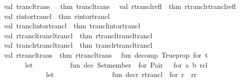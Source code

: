 \begin{isabellebody}
\ \ val\ trancl{\isacharunderscore}{\kern0pt}trans\ \ {\isacharequal}{\kern0pt}\ {\isacharat}{\kern0pt}{\isacharbraceleft}{\kern0pt}thm\ trancl{\isacharunderscore}{\kern0pt}trans{\isacharbraceright}{\kern0pt}{\isacharsemicolon}{\kern0pt}\isanewline
\ \ val\ rtrancl{\isacharunderscore}{\kern0pt}refl\ {\isacharequal}{\kern0pt}\ {\isacharat}{\kern0pt}{\isacharbraceleft}{\kern0pt}thm\ rtrancl{\isachardot}{\kern0pt}rtrancl{\isacharunderscore}{\kern0pt}refl{\isacharbraceright}{\kern0pt}{\isacharsemicolon}{\kern0pt}\isanewline
\ \ val\ r{\isacharunderscore}{\kern0pt}into{\isacharunderscore}{\kern0pt}rtrancl\ {\isacharequal}{\kern0pt}\ {\isacharat}{\kern0pt}{\isacharbraceleft}{\kern0pt}thm\ r{\isacharunderscore}{\kern0pt}into{\isacharunderscore}{\kern0pt}rtrancl{\isacharbraceright}{\kern0pt}{\isacharsemicolon}{\kern0pt}\isanewline
\ \ val\ trancl{\isacharunderscore}{\kern0pt}into{\isacharunderscore}{\kern0pt}rtrancl\ {\isacharequal}{\kern0pt}\ {\isacharat}{\kern0pt}{\isacharbraceleft}{\kern0pt}thm\ trancl{\isacharunderscore}{\kern0pt}into{\isacharunderscore}{\kern0pt}rtrancl{\isacharbraceright}{\kern0pt}{\isacharsemicolon}{\kern0pt}\isanewline
\ \ val\ rtrancl{\isacharunderscore}{\kern0pt}trancl{\isacharunderscore}{\kern0pt}trancl\ {\isacharequal}{\kern0pt}\ {\isacharat}{\kern0pt}{\isacharbraceleft}{\kern0pt}thm\ rtrancl{\isacharunderscore}{\kern0pt}trancl{\isacharunderscore}{\kern0pt}trancl{\isacharbraceright}{\kern0pt}{\isacharsemicolon}{\kern0pt}\isanewline
\ \ val\ trancl{\isacharunderscore}{\kern0pt}rtrancl{\isacharunderscore}{\kern0pt}trancl\ {\isacharequal}{\kern0pt}\ {\isacharat}{\kern0pt}{\isacharbraceleft}{\kern0pt}thm\ trancl{\isacharunderscore}{\kern0pt}rtrancl{\isacharunderscore}{\kern0pt}trancl{\isacharbraceright}{\kern0pt}{\isacharsemicolon}{\kern0pt}\isanewline
\ \ val\ rtrancl{\isacharunderscore}{\kern0pt}trans\ {\isacharequal}{\kern0pt}\ {\isacharat}{\kern0pt}{\isacharbraceleft}{\kern0pt}thm\ rtrancl{\isacharunderscore}{\kern0pt}trans{\isacharbraceright}{\kern0pt}{\isacharsemicolon}{\kern0pt}\isanewline
\isanewline
\ \ fun\ decomp\ \isactrlConstUNDERSCORE {\isasymopen}Trueprop\ for\ t{\isasymclose}\ {\isacharequal}{\kern0pt}\isanewline
\ \ \ \ \ \ \ \ let\isanewline
\ \ \ \ \ \ \ \ \ \ fun\ dec\ \isactrlConstUNDERSCORE {\isasymopen}Set{\isachardot}{\kern0pt}member\ {\isacharunderscore}{\kern0pt}\ for\ \isactrlConstUNDERSCORE {\isasymopen}Pair\ {\isacharunderscore}{\kern0pt}\ {\isacharunderscore}{\kern0pt}\ for\ a\ b{\isasymclose}\ rel{\isasymclose}\ {\isacharequal}{\kern0pt}\isanewline
\ \ \ \ \ \ \ \ \ \ \ \ \ \ let\isanewline
\ \ \ \ \ \ \ \ \ \ \ \ \ \ \ \ fun\ decr\ \isactrlConstUNDERSCORE {\isasymopen}rtrancl\ {\isacharunderscore}{\kern0pt}\ for\ r{\isasymclose}\ {\isacharequal}{\kern0pt}\ {\isacharparenleft}{\kern0pt}r{\isacharcomma}{\kern0pt}{\isachardoublequote}{\kern0pt}r{\isacharasterisk}{\kern0pt}{\isachardoublequote}{\kern0pt}{\isacharparenright}{\kern0pt}\isanewline

\end{isabellebody}
